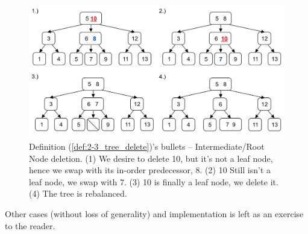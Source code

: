 \begin{figure}[ht!] 
    \begin{center}
    \includegraphics[width=\textwidth]{./Sections/graphs/search/2_3_delete_4.png}
    \end{center}

    \vspace{-1.5em}
     \caption{Definition (\ref{def:2-3_tree_delete})'s bullets -- Intermediate/Root Node deletion. 
     (1) We desire to delete 10, but it's not a leaf node, hence we swap with its in-order predecessor, 8. (2) 10 Still isn't a leaf node, we swap with 7. (3) 10 is finally a leaf node, we delete it.
     (4) The tree is rebalanced.}\label{fig:2-3_tree_delete_4}
\end{figure}

\noindent
Other cases (without loss of generality) and implementation is left as an exercise to the reader.

\newpage